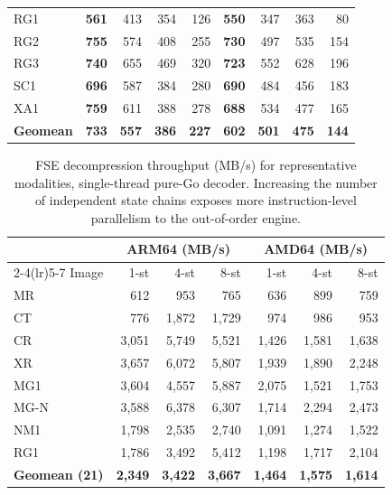 \documentclass[11pt]{article}
\begin{document}
\begin{table}[htbp]
{\begin{tabular}{l|rrrr|rrrr}
RG1  & \textbf{561} & 413          & 354 & 126 & \textbf{550} & 347 & 363 &  80 \\
RG2  & \textbf{755} & 574          & 408 & 255 & \textbf{730} & 497 & 535 & 154 \\
RG3  & \textbf{740} & 655          & 469 & 320 & \textbf{723} & 552 & 628 & 196 \\
SC1  & \textbf{696} & 587          & 384 & 280 & \textbf{690} & 484 & 456 & 183 \\
XA1  & \textbf{759} & 611          & 388 & 278 & \textbf{688} & 534 & 477 & 165 \\
\midrule
\textbf{Geomean} & \textbf{733} & \textbf{557} & \textbf{386} & \textbf{227} & \textbf{602} & \textbf{501} & \textbf{475} & \textbf{144} \\
\bottomrule
\end{tabular}}
\end{table}

\begin{table}[htbp]
\centering
\caption{FSE decompression throughput (MB/s) for representative modalities,
single-thread pure-Go decoder. Increasing the number of independent state
chains exposes more instruction-level parallelism to the out-of-order
engine.}
\label{tab:fse-combined}
\footnotesize
\setlength{\tabcolsep}{6pt}
\begin{tabular}{lrrrrrr}
\toprule
 & \multicolumn{3}{c}{ARM64 (MB/s)} & \multicolumn{3}{c}{AMD64 (MB/s)} \\
\cmidrule(lr){2-4}\cmidrule(lr){5-7}
Image & 1-st & 4-st & 8-st & 1-st & 4-st & 8-st \\
\midrule
MR   &   612 &   953 &   765 &   636 &   899 &   759 \\
CT   &   776 & 1,872 & 1,729 &   974 &   986 &   953 \\
CR   & 3,051 & 5,749 & 5,521 & 1,426 & 1,581 & 1,638 \\
XR   & 3,657 & 6,072 & 5,807 & 1,939 & 1,890 & 2,248 \\
MG1  & 3,604 & 4,557 & 5,887 & 2,075 & 1,521 & 1,753 \\
MG-N & 3,588 & 6,378 & 6,307 & 1,714 & 2,294 & 2,473 \\
NM1  & 1,798 & 2,535 & 2,740 & 1,091 & 1,274 & 1,522 \\
RG1  & 1,786 & 3,492 & 5,412 & 1,198 & 1,717 & 2,104 \\
\midrule
\textbf{Geomean (21)} & \textbf{2,349} & \textbf{3,422} & \textbf{3,667} &
\textbf{1,464} & \textbf{1,575} & \textbf{1,614} \\
\bottomrule
\end{tabular}
\end{table}
\end{document}
